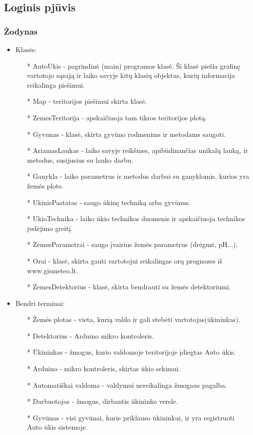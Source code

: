 \documentclass[oneside]{VUMIFPSkursinis}
\begin{document}
\subsection{Loginis pjūvis}
\subsubsection{Žodynas}
\begin{itemize}
	\item Klasės:
		\begin{itemize}
			\item[*] AutoUkis - pagrindinė (main) programos klasė. Ši klasė piešia grafinę vartotojo sąsają ir laiko savyje kitų klasių objektus, kurių informacija reikalinga piešimui.
			\item[*] Map - teritorijos piešimui skirta klasė.
			\item[*] ZemesTeritorija - apskaičiuoja tam tikros teritorijos plotą.
 			\item[*] Gyvunas - klasė, skirta gyvūno rodmenims ir metodams saugoti.
			\item[*] AriamasLaukas - laiko savyje reikšmes, apibūdinančias unikalų lauką, ir metodus, susijusius su lauko darbu.
			\item[*] Ganykla - laiko parametrus ir metodus darbui su ganyklomis, kurios yra žemės plote.
			\item[*] UkinisPastatas - saugo ūkinę techniką arba gyvūnus.
			\item[*] UkioTechnika - laiko ūkio technikos duomenis ir apskaičiuoja technikos judėjimo greitį.
			\item[*] ZemesParametrai - saugo įvairius žemės parametrus (drėgmė, pH...).
			\item[*] Orai - klasė, skirta gauti vartotojui reikalingas orų prognozes iš www.gismeteo.lt.
			\item[*] ZemesDetektorius - klasė, skirta bendrauti su žemės detektoriumi.


		\end{itemize}
	\item Bendri terminai:
		\begin{itemize}
			\item[*] Žemės plotas - vieta, kurią valdo ir gali stebėti vartotojas(ūkininkas). 
			\item[*] Detektorius - Arduino mikro kontroleris.
			\item[*] Ūkininkas - žmogus, kurio valdomoje teritorijoje įdiegtas Auto ūkis.
			\item[*] Arduino - mikro kontroleris, skirtas ūkio sekimui.
			\item[*] Automatiškai valdoma - valdymui nereikalinga žmogaus pagalba.
			\item[*] Darbuotojas - žmogus, dirbantis ūkininko versle.
			\item[*] Gyvūnas - visi gyvūnai, kurie priklauso ūkininkui, ir yra registruoti Auto ūkis sistemoje.
		\end{itemize}
\end{itemize}
\end{document}
